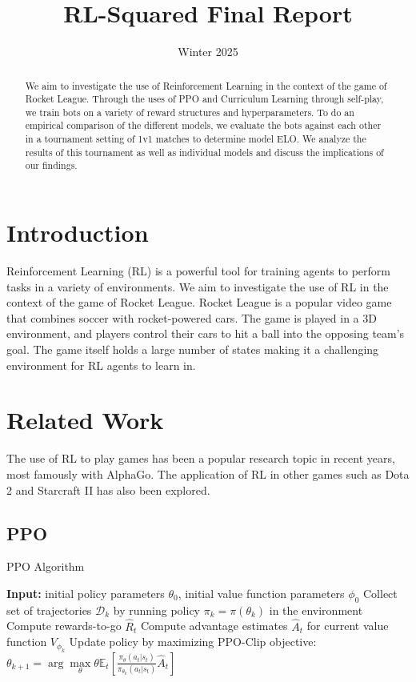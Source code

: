 \documentclass[conference]{IEEEtran}
\title{RL-Squared Final Report}
\author{
    \IEEEauthorblockN{Anshuman Dash, Phillip Peng, Matthew Shen}
    \IEEEauthorblockA{
        Department of Computer Science\\
        University of California, Santa Barbara\\
        Email: \{anshumandash, phillippeng, matthewshen\}@ucsb.edu
    }
}
\date{Winter 2025}
\begin{document}
\maketitle


\begin{abstract}
We aim to investigate the use of Reinforcement Learning in the context of the game of Rocket League. Through the uses of PPO and Curriculum Learning through self-play, we train bots on a variety of reward structures and hyperparameters. To do an empirical comparison of the different models, we evaluate the bots against each other in a tournament setting of 1v1 matches to determine model ELO. We analyze the results of this tournament as well as individual models and discuss the implications of our findings.
\end{abstract}

\section{Introduction}
Reinforcement Learning (RL) is a powerful tool for training agents to perform tasks in a variety of environments. We aim to investigate the use of RL in the context of the game of Rocket League. Rocket League is a popular video game that combines soccer with rocket-powered cars. The game is played in a 3D environment, and players control their cars to hit a ball into the opposing team's goal. The game itself holds a large number of states making it a challenging environment for RL agents to learn in. 

\section{Related Work}
The use of RL to play games has been a popular research topic in recent years, most famously with AlphaGo. The application of RL in other games such as Dota 2  and Starcraft II  has also been explored. 

\subsection{PPO}

\begin{algorithm*}
    \caption{PPO Algorithm}
    \begin{algorithmic}[1]
        \State \textbf{Input:} initial policy parameters $\theta_0$, initial value function parameters $\phi_0$
            \State Collect set of trajectories $\mathcal{D}_k$ by running policy $\pi_k = \pi(\theta_k)$ in the environment
            \State Compute rewards-to-go $\hat{R}_t$ 
            \State Compute advantage estimates $\hat{A}_t$ for current value function $V_{\phi_k}$
            \State Update policy by maximizing PPO-Clip objective:
            \State \hspace{1cm} $\theta_{k+1} = \arg\underset{\theta}{\max}{\theta} \mathbb{E}_t \left[ \frac{\pi_{\theta}(a_t|s_t)}{\pi_{\theta_k}(a_t|s_t)} \hat{A}_t \right]$
        \EndFor
    \end{algorithmic}
    \label{alg:PPO}
\end{algorithm*}
\end{document}
